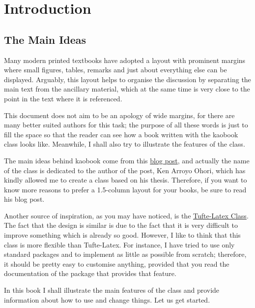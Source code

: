 \setchapterpreamble[u]{\margintoc}
\chapter{Introduction}

\section{The Main Ideas}

Many modern printed textbooks have adopted a layout with prominent 
margins where small figures, tables, remarks and just about everything 
else can be displayed. Arguably, this layout helps to organise the 
discussion by separating the main text from the ancillary material, 
which at the same time is very close to the point in the text where 
it is referenced.

This document does not aim to be an apology of wide margins, for there 
are many better suited authors for this task; the purpose of all these 
words is just to fill the space so that the reader can see how a book 
written with the kaobook class looks like. Meanwhile, I shall also try 
to illustrate the features of the class.

The main ideas behind kaobook come from this 
\href{https://3d.bk.tudelft.nl/ken/en/2016/04/17/a-1.5-column-layout-in-latex.html}{blog 
post}, and actually the name of the class is dedicated to the author 
of the post, Ken Arroyo Ohori, which has kindly allowed me to create a 
class based on his thesis. Therefore, if you want to know more reasons 
to prefer a 1.5-column layout for your books, be sure to read his blog 
post.

Another source of inspiration, as you may have noticed, is the 
\href{https://github.com/Tufte-LaTeX/tufte-latex}{Tufte-Latex Class}. 
The fact that the design is similar is due to the fact that it is very 
difficult to improve something which is already so good. However, I like 
to think that this class is more flexible than Tufte-Latex. For 
instance, I have tried to use only standard packages and to implement as 
little as possible from scratch; therefore, it should be pretty easy 
to customise anything, provided that you read the documentation of the 
package that provides that feature.

In this book I shall illustrate the main features of the class and 
provide information about how to use and change things. Let us get 
started.

